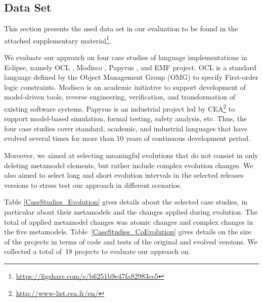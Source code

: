 \subsection{Data Set}

This section presents the used data set in our evaluation to be found in the attached supplementary material\footnote{\url{https://figshare.com/s/b6251b9e47fa82983ce5}}. 



We evaluate our approach on four case studies of language implementations in Eclipse, namely OCL \cite{MDTOCL}, Modisco \cite{MDTModisco}, Papyrus \cite{MDTPapyrus}, and EMF \cite{EclipseEMF} project. 
%
OCL is a standard language defined by the Object Management Group (OMG) to specify First-order logic constraints. Modisco is an academic initiative to support development of model-driven tools, reverse engineering, verification, and transformation of existing software systems. 
Papyrus is an industrial project led by CEA\footnote{\url{http://www-list.cea.fr/en/}} to support model-based simulation, formal testing, safety analysis, etc. 
Thus, the four case studies cover standard, academic, and industrial languages that have evolved several times for more than 10 years of continuous development period. 

Moreover, we aimed at selecting meaningful evolutions that do not consist in only deleting metamodel elements, but rather include complex evolution changes. We also aimed to select long and short evolution intervals in the selected releases versions to stress test our approach in different scenarios. 


Table \ref{CaseStudies_Evolution} gives details about the selected case studies, in particular about their metamodels and the changes applied during evolution. 
The total of applied metamodel changes was  atomic changes and  complex changes in the five metamodels.
%
Table~\ref{CaseStudies_CoEvolution} gives details on the size of the projects in terms of code and tests of the original and evolved versions. 
We collected a total of~18 projects to evaluate our approach on.  



